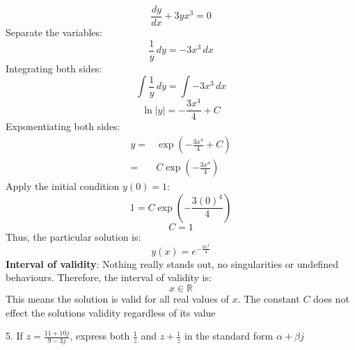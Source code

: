\documentclass[a4paper, 12pt]{report}
\def\ni{green!60!black!40!white}
\begin{document}
    \[\frac{dy}{dx} + 3y x^3 = 0\]
    Separate the variables:
    \[\frac{1}{y} \, dy = -3x^3 \, dx\]
    Integrating both sides:
    \[\int \frac{1}{y} \, dy = \int -3x^3 \, dx\]
    \[\ln|y| = -\frac{3x^4}{4} + C\]
    Exponentiating both sides:
    \begin{align*}
        y=&\exp\left(-\frac{3x^4}{4} + C\right)\\
            =&C \exp\left(-\frac{3x^4}{4}\right)
    \end{align*}
    Apply the initial condition \( y(0) = 1 \):
    \[1 = C \exp\left(-\frac{3(0)^4}{4}\right)\]
    \[C = 1\]
    Thus, the particular solution is:
    \[\boxed{y(x) = e^{-\frac{3x^4}{4}}}\]
    \textbf{Interval of validity}: Nothing really stands out, no singularities or undefined behaviours. Therefore, the interval of validity is:
    \[x\in \mathbb{R}\]        
    This means the solution is valid for all real values of \(x\). The constant \(C\) does not effect the solutions validity regardless of its value
    
    \newpage
    
    \begin{tcolorbox}[title={\color{black}\section{Q5}}, colback=white, colframe=\ni, boxrule=1mm, width=1\textwidth]
        5. If \( z = \frac{11 + 10{j}}{9 - 3{j}} \), express both \( \frac{1}{z} \) and \( z + \frac{1}{z} \) in the standard form \( \alpha + \beta {j} \)
    \end{tcolorbox}
    
\end{document}
